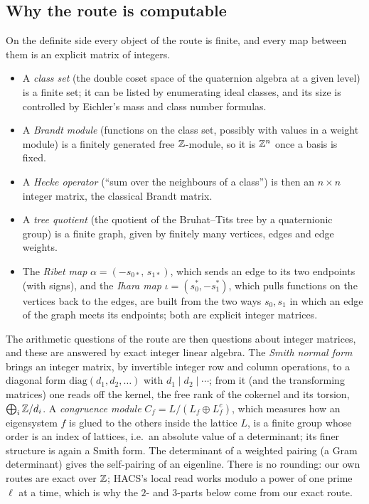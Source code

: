 \subsection*{Why the route is computable}
On the definite side every object of the route is finite, and every map between them is an explicit matrix of integers.
\begin{itemize}
\item A \emph{class set} (the double coset space of the quaternion algebra at a given level) is a finite set; it can be listed
  by enumerating ideal classes, and its size is controlled by Eichler's mass and class number formulas.
\item A \emph{Brandt module} (functions on the class set, possibly with values in a weight module) is a finitely generated
  free $\mathbb{Z}$-module, so it is $\mathbb{Z}^n$ once a basis is fixed.
\item A \emph{Hecke operator} (``sum over the neighbours of a class'') is then an $n\times n$ integer matrix, the classical
  Brandt matrix.
\item A \emph{tree quotient} (the quotient of the Bruhat--Tits tree by a quaternionic group) is a finite graph, given by finitely
  many vertices, edges and edge weights.
\item The \emph{Ribet map} $\alpha=(-s_{0*},\,s_{1*})$, which sends an edge to its two endpoints (with signs), and the
  \emph{Ihara map} $\iota=(s_0^*,-s_1^*)$, which pulls functions on the vertices back to the edges, are built from the two
  ways $s_0,s_1$ in which an edge of the graph meets its endpoints; both are explicit integer matrices.
\end{itemize}
The arithmetic questions of the route are then questions about integer matrices, and these are answered by exact integer
linear algebra. The \emph{Smith normal form} brings an integer matrix, by invertible integer row and column operations, to a
diagonal form $\mathrm{diag}(d_1,d_2,\dots)$ with $d_1\mid d_2\mid\cdots$; from it (and the transforming matrices) one reads off the kernel, the free rank of
the cokernel and its torsion, $\bigoplus_i\mathbb{Z}/d_i$. A \emph{congruence module} $C_f=L/(L_f\oplus L_f^c)$, which measures how an
eigensystem $f$ is glued to the others inside the lattice $L$, is a finite group whose order is an index of lattices, i.e.\ an
absolute value of a determinant; its finer structure is again a Smith form. The determinant of a weighted pairing (a Gram
determinant) gives the self-pairing of an eigenline. There is no rounding: our own routes are exact over $\mathbb{Z}$; HACS's local read works modulo a power of one prime $\ell$ at a time,
which is why the $2$- and $3$-parts below come from our exact route.

